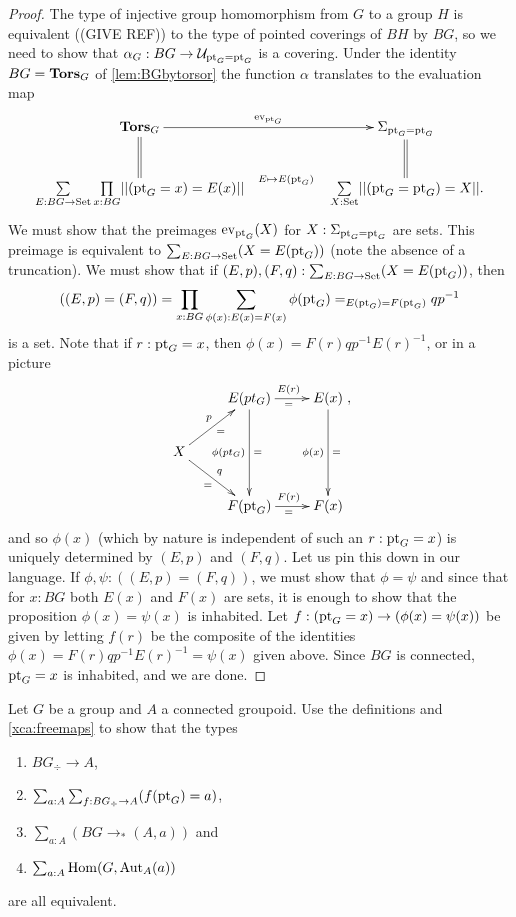 \begin{proof}
  The type of injective group homomorphism from $G$ to a group $H$ is equivalent ((GIVE REF)) to the type of pointed coverings of $BH$ by $BG$, so we need to show that $\alpha_G:BG\to\mathcal{U}_{{\mathord{\mathrm{pt}}}_G={\mathord{\mathrm{pt}}}_G}$ is a covering.  
Under the identity $BG=\mathbf{Tors}_G$ of \cref{lem:BGbytorsor} the function $\alpha$ translates to the evaluation map
$$\xymatrix{
  \typetorsor_G\ar[rr]^-{\mathrm{ev}_{\pt_G}}\ar@{=}[d]&&\Sigma_{\pt_G=\pt_G}\ar@{=}[d]\\
  \underset{E:BG\to\Set}\sum\,\underset{x:BG}\prod||(\pt_G=x)=E(x)||\ar@{}[rr]^-{E\mapsto E(\pt_G)}&&
\,\underset{X:\Set}\sum||(\pt_G=\pt_G)=X||.
}$$
We must show that the preimages $\mathrm{ev}_{{\mathord{\mathrm{pt}}}_G}(X)$ for $X:\Sigma_{{\mathord{\mathrm{pt}}}_G={\mathord{\mathrm{pt}}}_G}$ are sets.  
This preimage is equivalent to $\sum_{E:BG\to\mathord{\mathrm{Set}}}(X=E({\mathord{\mathrm{pt}}}_G))$ (note the absence of a truncation).  We must show that if $(E,p),(F,q):\sum_{E:BG\to\mathord{\mathrm{Set}}}(X=E({\mathord{\mathrm{pt}}}_G))$, then 
$$((E,p)=(F,q))=\prod_{x:BG}\sum_{\phi(x):E(x)=F(x)}\phi({\mathord{\mathrm{pt}}}_G)=_{E({\mathord{\mathrm{pt}}}_G)=F({\mathord{\mathrm{pt}}}_G)}qp^{-1}$$ is a set.  
Note that if $r:{\mathord{\mathrm{pt}}}_G=x$, then $\phi(x)=F(r)qp^{-1}E(r)^{-1}$, or in a picture
$$\xymatrix{&E(pt_G)\ar[r]^{E(r)}_=\ar[dd]_{\phi(pt_G)}^=&E(x)\ar[dd]_{\phi(x)}^=\\
  X\ar[ur]^p_=\ar[dr]^q_=&&\\
  &F(\pt_G)\ar[r]^{F(r)}_=&F(x)},$$
and so $\phi(x)$ (which by nature is independent of such an $r:{\mathord{\mathrm{pt}}}_G=x$) is uniquely determined by $(E,p)$ and $(F,q)$.  Let us pin this down in our language.
If $\phi,\psi:((E,p)=(F,q))$, we must show that $\phi=\psi$ and since that for $x:BG$ both $E(x)$ and $F(x)$ are sets, it is enough to show that the proposition $\phi(x)=\psi(x)$ is inhabited.  Let $f:({\mathord{\mathrm{pt}}}_G=x)\to(\phi(x)=\psi(x))$ be given by letting $f(r)$ be the composite of the identities $\phi(x)=F(r)qp^{-1}E(r)^{-1}=\psi(x)$ given above.  Since $BG$ is connected, ${\mathord{\mathrm{pt}}}_G=x$ is inhabited, and we are done.
\end{proof}



\begin{xca}\label{xca:BGtotype}
  Let $G$ be a group and $A$ a connected groupoid.  Use the definitions and \cref{xca:freemaps} to show that the types
  \begin{enumerate}
  \item $BG_\div\to A$, 
  \item $\sum_{a:A}\sum_{f:BG_\div \to A}(f({\mathord{\mathrm{pt}}}_G)=a)$, 
  \item $\sum_{a:A}(BG\to_*(A,a))$ and 
  \item $\sum_{a:A}\mathrm{Hom}(G,\mathrm{Aut}_A(a))$
  \end{enumerate}
 are all equivalent.
\end{xca}

